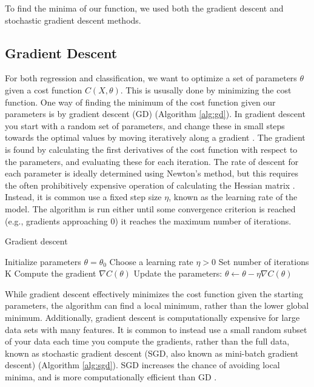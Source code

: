 To find the minima of our function, we used both the gradient descent and stochastic gradient descent methods.

\subsection{Gradient Descent}\label{ssec:gradient_descent}

For both regression and classification, we want to optimize a set of parameters $\theta$ given a cost function $C(X, \theta)$. This is ususally done by minimizing the cost function. One way of finding the minimum of the cost function given our parameters is by gradient descent (GD) (Algorithm \ref{alg:gd}). In gradient descent you start with a random set of parameters, and change these in small steps towards the optimal values by moving iteratively along a gradient \cite{Goodfellow:2016:deep_learning}. The gradient is found by calculating the first derivatives of the cost function with respect to the parameters, and evaluating these for each iteration. The rate of descent for each parameter is ideally determined using Newton's method, but this requires the often prohibitively expensive operation of calculating the Hessian matrix \cite{battiti1992:newtons_method}. Instead, it is common use a fixed step size $\eta$, known as the learning rate of the model. The algorithm is run either until some convergence criterion is reached (e.g., gradients approaching 0) it reaches the maximum number of iterations.

\begin{algorithm}
\caption{Gradient descent}\label{alg:gd}
\begin{algorithmic}[1]
    \STATE Initialize parameters $\theta = \theta_0$
    \STATE Choose a learning rate $\eta > 0$
    \STATE Set number of iterations K
        \STATE Compute the gradient $\nabla C(\theta)$
        \STATE Update the parameters: $\theta \leftarrow \theta - \eta \nabla C(\theta)$
    \ENDFOR
\end{algorithmic}
\end{algorithm}

While gradient descent effectively minimizes the cost function given the starting parameters, the algorithm can find a local minimum, rather than the lower global minimum. Additionally, gradient descent is computationally expensive for large data sets with many features. It is common to instead use a small random subset of your data each time you compute the gradients, rather than the full data, known as stochastic gradient descent (SGD, also known as mini-batch gradient descent) (Algorithm \ref{alg:sgd}). SGD increases the chance of avoiding local minima, and is more computationally efficient than GD \cite{Goodfellow:2016:deep_learning}.

